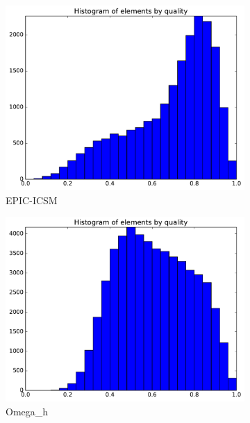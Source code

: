 \documentclass[3p,times,procedia,number]{elsarticle}
\begin{document}
\begin{figure}
\begin{subfigure}{.4\textwidth}
\includegraphics[width=\textwidth]{epic-icsm-cube-cylinder-polar-1-quality.pdf}
\caption{EPIC-ICSM}
\end{subfigure}
\begin{subfigure}{.4\textwidth}
\centering
\includegraphics[width=\textwidth]{omega_h-cube-cylinder-polar-1-quality.pdf}
\caption{Omega\_h}
\label{fig:omega_h-cube-cylinder-polar-1-quality}
\end{subfigure}
\begin{subfigure}{.4\textwidth}
\centering

\end{subfigure}
\end{figure}
\end{document}
